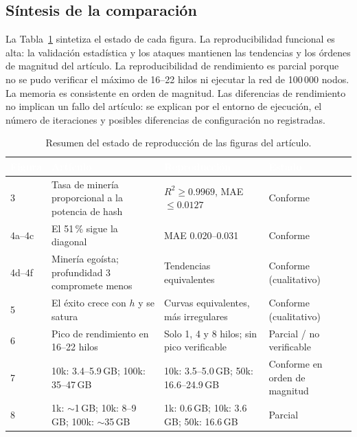 \documentclass[11pt,a4paper,oneside]{article}
\begin{document}
\subsection{Síntesis de la comparación}

La Tabla~\ref{tab:resumen} sintetiza el estado de cada figura. La reproducibilidad funcional es alta: la validación estadística y los ataques mantienen las tendencias y los órdenes de magnitud del artículo. La reproducibilidad de rendimiento es parcial porque no se pudo verificar el máximo de 16--22 hilos ni ejecutar la red de 100\,000 nodos. La memoria es consistente en orden de magnitud. Las diferencias de rendimiento no implican un fallo del artículo: se explican por el entorno de ejecución, el número de iteraciones y posibles diferencias de configuración no registradas.

\begin{table}[htbp]
\caption{Resumen del estado de reproducción de las figuras del artículo.}
\label{tab:resumen}
\centering
\small
\renewcommand{\arraystretch}{1.12}
\begin{tabularx}{\textwidth}{l>{\raggedright\arraybackslash}X>{\raggedright\arraybackslash}Xl}
\toprule
\rowcolor{tablehead}
\textcolor{white}{\textbf{Figura}} &
\textcolor{white}{\textbf{Artículo}} &
\textcolor{white}{\textbf{Reproducción}} &
\textcolor{white}{\textbf{Estado}} \\
\midrule
3 & Tasa de minería proporcional a la potencia de hash & $R^2 \ge 0.9969$, MAE $\le 0.0127$ & Conforme \\
4a--4c & El 51\,\% sigue la diagonal & MAE 0.020--0.031 & Conforme \\
4d--4f & Minería egoísta; profundidad 3 compromete menos & Tendencias equivalentes & Conforme (cualitativo) \\
5 & El éxito crece con $h$ y se satura & Curvas equivalentes, más irregulares & Conforme (cualitativo) \\
6 & Pico de rendimiento en 16--22 hilos & Solo 1, 4 y 8 hilos; sin pico verificable & Parcial / no verificable \\
7 & 10k: 3.4--5.9\,GB; 100k: 35--47\,GB & 10k: 3.5--5.0\,GB; 50k: 16.6--24.9\,GB & Conforme en orden de magnitud \\
8 & 1k: $\sim$1\,GB; 10k: 8--9\,GB; 100k: $\sim$35\,GB & 1k: 0.6\,GB; 10k: 3.6\,GB; 50k: 16.6\,GB & Parcial \\
\bottomrule
\end{tabularx}
\end{table}
\end{document}
